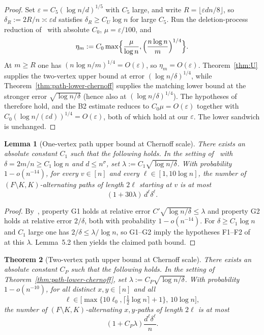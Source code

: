 \documentclass[11pt]{article}
\newtheorem{theorem}{Theorem}
\newtheorem{lemma}[theorem]{Lemma}
\begin{document}
\begin{proof}
Set \(\varepsilon=C_5(\log n/d)^{1/5}\) with \(C_5\) large, and write
\(R=\lfloor\varepsilon dn/8\rfloor\), so \(\delta_R:=2R/n\asymp\varepsilon d\) satisfies
\(\delta_R\ge C_U\log n\) for large \(C_5\).
Run the deletion-process reduction of~\cite[§3]{BIM25} with absolute \(C_0\),
\(\mu=\varepsilon/100\), and
\[
\eta_m:=C_0\max\Bigl\{\frac{\mu}{\log n},\Bigl(\frac{n\log n}{m}\Bigr)^{1/4}\Bigr\}.
\]
At \(m\ge R\) one has \((n\log n/m)^{1/4}=O(\varepsilon)\), so \(\eta_m=O(\varepsilon)\).
Theorem~\ref{thm:U} supplies the two-vertex upper bound at error
\((\log n/\delta)^{1/4}\), while Theorem~\ref{thm:path-lower-chernoff} supplies
the matching lower bound at the stronger error \(\sqrt{\log n/\delta}\)
(hence also at \((\log n/\delta)^{1/4}\)).
The hypotheses of~\cite[Theorem~4.1]{BIM25} therefore hold, and the B2 estimate
reduces to \(C_0\mu=O(\varepsilon)\) together with
\(C_0(\log n/(\varepsilon d))^{1/4}=O(\varepsilon)\), both of which hold at our
\(\varepsilon\).
The lower sandwich is unchanged.
\end{proof}

\begin{lemma}[One-vertex path upper bound at Chernoff scale]
\label{lem:one-vertex-chernoff}
There exists an absolute constant \(C_1\) such that the following holds.
In the setting of~\cite[Lemma~5.1]{BIM25} with \(\delta=2m/n\ge C_1\log n\) and
\(d\le n^{\sigma}\), set \(\lambda:=C_1\sqrt{\log n/\delta}\).
With probability \(1-o(n^{-14})\), for every \(v\in[n]\) and every
\(\ell\in[1,10\log n]\), the number of \((F\setminus K,K)\)-alternating paths of
length \(2\ell\) starting at \(v\) is at most
\[
(1+30\lambda)\,d^\ell\delta^\ell.
\]
\end{lemma}

\begin{proof}
By~\cite[Lemma~5.3]{BIM25}, property G1 holds at relative error
\(C'\sqrt{\log n/\delta}\le\lambda\) and property G2 holds at relative error
\(2/\delta\), both with probability \(1-o(n^{-14})\).
For \(\delta\ge C_1\log n\) and \(C_1\) large one has
\(2/\delta\le\lambda/\log n\), so G1--G2 imply the hypotheses F1--F2 of
~\cite[Lemma~5.2]{BIM25} at this \(\lambda\).
Lemma~5.2 then yields the claimed path bound.
\end{proof}

\begin{theorem}[Two-vertex path upper bound at Chernoff scale]
\label{thm:path-upper-chernoff}
There exists an absolute constant \(C_P\) such that the following holds.
In the setting of Theorem~\ref{thm:path-lower-chernoff}, set
\(\lambda:=C_P\sqrt{\log n/\delta}\).
With probability \(1-o(n^{-10})\), for all distinct \(x,y\in[n]\) and all
\[
\ell\in\bigl[\max\{10\ell_0,\lceil\tfrac12\log n\rceil+1\},\,10\log n\bigr],
\]
the number of \((F\setminus K,K)\)-alternating \(x,y\)-paths of length \(2\ell\) is at
most
\[
(1+C_P\lambda)\frac{d^\ell\delta^\ell}{n}.
\]
\end{theorem}
\end{document}
